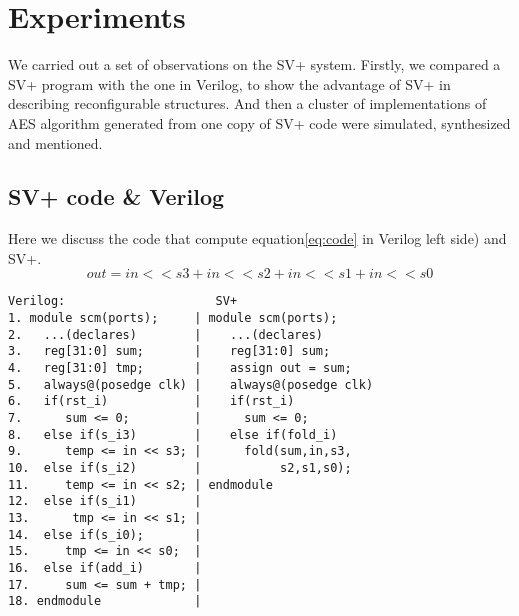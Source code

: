 \section{Experiments}\label{sec:experiments}
We carried out a set of observations on the SV+ system. Firstly, we compared a SV+ program with the one in Verilog, to show the advantage of SV+ in describing reconfigurable structures. And then a cluster of implementations of AES algorithm generated from one copy of SV+ code were simulated, synthesized and mentioned.
\subsection{SV+ code \& Verilog}
Here we discuss the code that compute equation\eqref{eq:code} in Verilog left side) and SV+.
\begin{equation}
out = in{<<}s3{+}in{<<}s2{+}in{<<}s1{+}in{<<}s0
\label{eq:code}
\end{equation}
\begin{verbatim}
Verilog:                     SV+
1. module scm(ports);     | module scm(ports);
2.   ...(declares)        |    ...(declares)
3.   reg[31:0] sum;       |    reg[31:0] sum;
4.   reg[31:0] tmp;       |    assign out = sum;
5.   always@(posedge clk) |    always@(posedge clk)
6.   if(rst_i)            |    if(rst_i)
7.      sum <= 0;         |      sum <= 0;
8.   else if(s_i3)        |    else if(fold_i)
9.      temp <= in << s3; |      fold(sum,in,s3,
10.  else if(s_i2)        |           s2,s1,s0);
11.     temp <= in << s2; | endmodule
12.  else if(s_i1)        |
13.      tmp <= in << s1; |
14.  else if(s_i0);       |
15.     tmp <= in << s0;  |
16.  else if(add_i)       |
17.     sum <= sum + tmp; |
18. endmodule             |
\end{verbatim}
